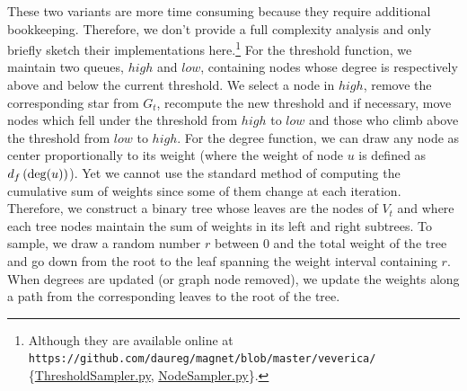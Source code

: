 These two variants are more time consuming because they require additional bookkeeping.
Therefore, we don't provide a full complexity analysis and only briefly sketch their implementations
here.\footnote{Although they are available online at 
\nolinkurl{https://github.com/daureg/magnet/blob/master/veverica/}%
\{\href{https://github.com/daureg/magnet/blob/master/veverica/ThresholdSampler.py}%
{ThresholdSampler.py}, \href{https://github.com/daureg/magnet/blob/master/veverica/NodeSampler.py}%
{NodeSampler.py}\}.} For the threshold function, we
maintain two queues, $high$ and $low$, containing nodes whose degree is respectively above and below
the current threshold. We select a node \uar{} in $high$, remove the corresponding star from $G_t$,
recompute the new threshold and if necessary, move nodes which fell under the threshold from $high$
to $low$ and those who climb above the threshold from $low$ to $high$. For the degree function, we
can draw any node as center proportionally to its weight (where the weight of node $u$ is defined as
$d_f\left(\operatorname{deg}(u)\right)$). Yet we cannot use the standard method of computing the cumulative sum
of weights since some of them change at each iteration. Therefore, we construct a binary tree whose
leaves are the nodes of $V_t$ and where each tree nodes maintain the sum of weights in its left and
right subtrees. To sample, we draw a random number $r$ between $0$ and the total weight of the tree and
go down from the root to the leaf spanning the weight interval containing $r$.
When degrees are updated (or graph node removed), we update the weights along a path from the
corresponding leaves to the root of the tree.
